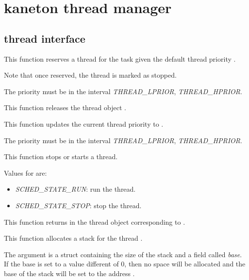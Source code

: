 \section{kaneton thread manager}

\subsection*{thread interface}

	 {
	   This function reserves a thread for the task 
	   given the default thread priority .

	   Note that once reserved, the thread is marked as stopped.

	   The priority must be in the interval \emph{THREAD\_LPRIOR},
	   \emph{THREAD\_HPRIOR}.
	 }

	 {
	   This function releases the thread object .
	 }

	 {
	   This function updates the current thread priority
	   to .

	   The priority must be in the interval \emph{THREAD\_LPRIOR},
	   \emph{THREAD\_HPRIOR}.
	 }

	 {
	   This function stops or starts a thread.

	   Values for  are:

	   \begin{itemize}
	     \item
	       \emph{SCHED\_STATE\_RUN}: run the thread.
	     \item
	       \emph{SCHED\_STATE\_STOP}: stop the thread.
	   \end{itemize}
	 }

	 {
	   This function returns in  the thread object
	   corresponding to .
	 }

	 {
	   This function allocates a stack for the thread .

	   The  argument is a struct containing the
	   size of the stack and a field called \emph{base}. If the
	   base is set to a value different of 0, then no space will
	   be allocated and the base of the stack will be set to the
	   address .
	 }

